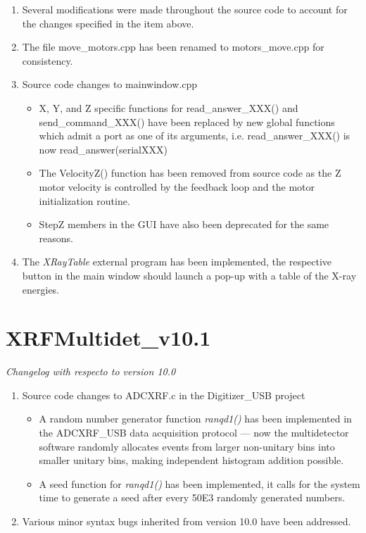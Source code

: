 \documentclass[a4paper,12pt]{article}
\begin{document}
\begin{enumerate}
\begin{itemize}
	\end{itemize}
	\item Several modifications were made throughout the source code to account for the changes specified in the item above.
	\item The file move\_motors.cpp has been renamed to motors\_move.cpp for consistency.
	\item Source code changes to mainwindow.cpp
	\begin{itemize}
		\item X, Y, and Z specific functions for read\_answer\_XXX() and send\_command\_XXX() have been replaced by new global functions which admit a port as one of its arguments, i.e. read\_answer\_XXX() is now read\_answer(serialXXX)
		\item The VelocityZ() function has been removed from source code as the Z motor velocity is controlled by the feedback loop and the motor initialization routine.
		\item StepZ members in the GUI have also been deprecated for the same reasons.
	\end{itemize}
	\item The \textit{XRayTable} external program has been implemented, the respective button in the main window should launch a pop-up with a table of the X-ray energies.
\end{enumerate}

\section{XRFMultidet\_v10.1}
\textit{Changelog with respecto to version 10.0}

\begin{enumerate}
	\item Source code changes to ADCXRF.c in the Digitizer\_USB project
	\begin{itemize}
		\item A random number generator function \textit{ranqd1()} has been implemented in the ADCXRF\_USB data acquisition protocol --- now the multidetector software randomly allocates events from larger non-unitary bins into smaller unitary bins, making independent histogram addition possible.
		\item A seed function for \textit{ranqd1()} has been implemented, it calls for the system time to generate a seed after every 50E3 randomly generated numbers.
	\end{itemize}
	\item Various minor syntax bugs inherited from version 10.0 have been addressed.
\end{enumerate}
\end{document}
